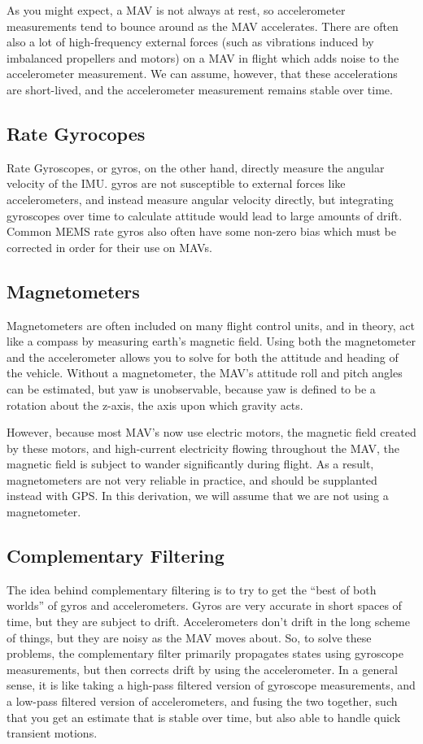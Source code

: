 \documentclass[paper=a4, fontsize=11pt]{scrartcl} %
\numberwithin{equation}{section} %
\numberwithin{figure}{section} %
\numberwithin{table}{section} %
\begin{document}
As you might expect, a MAV is not always at rest, so accelerometer measurements tend to bounce around as the MAV accelerates.  There are often also a lot of high-frequency external forces (such as vibrations induced by imbalanced propellers and motors) on a MAV in flight which adds noise to the accelerometer measurement.  We can assume, however, that these accelerations are short-lived, and the accelerometer measurement remains stable over time.

\subsection{Rate Gyrocopes}

Rate Gyroscopes, or gyros, on the other hand, directly measure the angular velocity of the IMU.  gyros are not susceptible to external forces like accelerometers, and instead measure angular velocity directly, but integrating gyroscopes over time to calculate attitude would lead to large amounts of drift.  Common MEMS rate gyros also often have some non-zero bias which must be corrected in order for their use on MAVs.

\subsection{Magnetometers}

Magnetometers are often included on many flight control units, and in theory, act like a compass by measuring earth's magnetic field.  Using both the magnetometer and the accelerometer allows you to solve for both the attitude and heading of the vehicle.  Without a magnetometer, the MAV's attitude roll and pitch angles can be estimated, but yaw is unobservable, because yaw is defined to be a rotation about the z-axis, the axis upon which gravity acts.

However, because most MAV's now use electric motors, the magnetic field created by these motors, and high-current electricity flowing throughout the MAV, the magnetic field is subject to wander significantly during flight.  As a result, magnetometers are not very reliable in practice, and should be supplanted instead with GPS.  In this derivation, we will assume that we are not using a magnetometer.

\subsection{Complementary Filtering}
The idea behind complementary filtering is to try to get the ``best of both worlds'' of gyros and accelerometers.  Gyros are very accurate in short spaces of time, but they are subject to drift.  Accelerometers don't drift in the long scheme of things, but they are noisy as the MAV moves about.  So, to solve these problems, the complementary filter primarily propagates states using gyroscope measurements, but then corrects drift by using the accelerometer.  In a general sense, it is like taking a high-pass filtered version of gyroscope measurements, and a low-pass filtered version of accelerometers, and fusing the two together, such that you get an estimate that is stable over time, but also able to handle quick transient motions.
\end{document}
